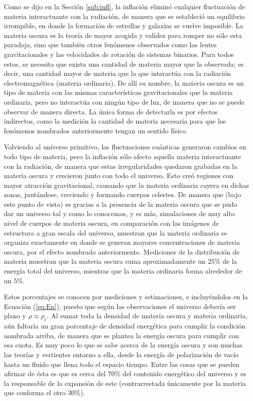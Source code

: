 Como se dijo en la Sección \ref{sub:infl}, la inflación eliminó cualquier fluctuación de materia interactuante con la radiación, de manera que se estableció un equilibrio irrompible, en donde la formación de estrellas y galaxias se vuelve imposible. La materia oscura es la teoría de mayor acogida y validez para romper no sólo esta paradoja, sino que también otros fenómenos observados como las lentes gravitacionales y las velocidades de rotación de sistemas binarios. Para todos estos, se necesita que exista una cantidad de materia mayor que la observada; es decir, una cantidad mayor de materia que la que interactúa con la radiación electromagnética (materia ordinaria). De allí su nombre, la materia oscura es un tipo de materia con las mismas características gravitacionales que la materia ordinaria, pero no interactúa con ningún tipo de luz, de manera que no se puede observar de manera directa. La única forma de detectarla es por efectos indirectos, como la medición la cantidad de materia necesaria para que los fenómenos nombrados anteriormente tengan un sentido físico. 

Volviendo al universo primitivo, las fluctuaciones cuánticas generaron cambios en todo tipo de materia, pero la inflación sólo afecto aquella materia interactuante con la radiación, de manera que estas irregularidades quedaron grabadas en la materia oscura y crecieron junto con todo el universo. Esto creó regiones con mayor atracción gravitacional, causando que la materia ordinaria cayera en dichas zonas, juntándose, creciendo y formando cuerpos celestes. De manera que (bajo este punto de vista) es gracias a la presencia de la materia oscura que se pudo dar un universo tal y como lo conocemos, y es más, simulaciones de muy alto nivel de cuerpos de materia oscura, en comparación con las imágenes de estructura a gran escala del universo, muestran que la materia ordinaria se organiza exactamente en donde se generan mayores concentraciones de materia oscura, por el efecto nombrado anteriormente. Mediciones de la distribución de materia muestran que la materia oscura suma aproximadamente un $25\%$ de la energía total del universo, mientras que la materia ordinaria forma alrededor de un $5\%$. 

Estos porcentajes se conocen por mediciones y estimaciones, e incluyéndolos en la Ecuación (\ref{eq:En}), puesto que según las observaciones el universo debería ser plano y $\rho\approx\rho_c$. Al sumar toda la densidad de materia oscura y materia ordinaria, aún faltaría un gran porcentaje de densidad energética para cumplir la condición nombrada arriba, de manera que se plantea la energía oscura para cumplir con esa cuota. Es muy poco lo que se sabe acerca de la energía oscura y son muchas las teorías y vertientes entorno a ella, desde la energía de polarización de vacío hasta un fluido que llena todo el espacio tiempo. Entre las cosas que se pueden afirmar de ésta es que es cerca del $70\%$ del contenido energético del universo y es la responsable de la expansión de este (contrarrestada únicamente por la materia que conforma el otro $30\%$).


